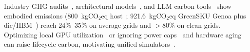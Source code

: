 Industry GHG audits~\cite{gupta2021chasing}, architectural models~\cite{gupta2022act,acun2023carbonexplorer}, and LLM carbon tools~\cite{faiz2024llmcarbon,li2025ecoserve} show embodied emissions (800~kgCO$_2$eq host~\cite{li2025ecoserve}; 921.6~kgCO$_2$eq GreenSKU Genoa plus die/HBM~\cite{faiz2024llmcarbon}) reach 24\%--35\% on average grids and $>80\%$ on clean grids. Optimizing local GPU utilization~\cite{sinha2025utilization} or ignoring power caps~\cite{kakolyris2025throttllem,stojkovic2025dynamollm,stojkovic2025tapas} and hardware aging~\cite{hewage2025aging,li2023clover} can raise lifecycle carbon, motivating unified simulators~\cite{calheiros2011cloudsim}.
